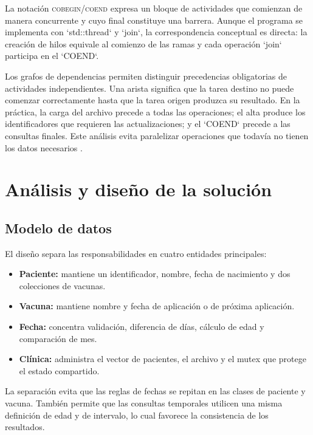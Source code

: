 \documentclass[12pt,letterpaper]{article}
\begin{document}
La notación \textsc{cobegin}/\textsc{coend} expresa un bloque de actividades que
comienzan de manera concurrente y cuyo final constituye una barrera. Aunque el
programa se implementa con `std::thread` y `join`, la correspondencia conceptual
es directa: la creación de hilos equivale al comienzo de las ramas y cada
operación `join` participa en el `COEND`.

Los grafos de dependencias permiten distinguir precedencias obligatorias de
actividades independientes. Una arista significa que la tarea destino no puede
comenzar correctamente hasta que la tarea origen produzca su resultado. En la
práctica, la carga del archivo precede a todas las operaciones; el alta produce
los identificadores que requieren las actualizaciones; y el `COEND` precede a
las consultas finales. Este análisis evita paralelizar operaciones que todavía
no tienen los datos necesarios \cite{dijkstra1968,hoare1978}.

\section{Análisis y diseño de la solución}

\subsection{Modelo de datos}

El diseño separa las responsabilidades en cuatro entidades principales:

\begin{itemize}[leftmargin=1.2cm]
    \item \textbf{Paciente:} mantiene un identificador, nombre, fecha de
    nacimiento y dos colecciones de vacunas.
    \item \textbf{Vacuna:} mantiene nombre y fecha de aplicación o de próxima
    aplicación.
    \item \textbf{Fecha:} concentra validación, diferencia de días, cálculo de
    edad y comparación de mes.
    \item \textbf{Clínica:} administra el vector de pacientes, el archivo y el
    mutex que protege el estado compartido.
\end{itemize}

La separación evita que las reglas de fechas se repitan en las clases de
paciente y vacuna. También permite que las consultas temporales utilicen una
misma definición de edad y de intervalo, lo cual favorece la consistencia de
los resultados.
\end{document}
